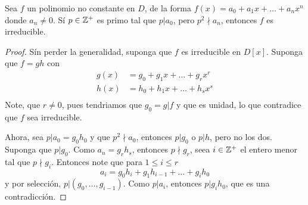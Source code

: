 \begin{theorem}\label{18.77}
    Sea $f$ un polinomio no constante en $D$, de la forma
    $f(x)=a_0+a_1x+\dots+a_nx^n$ donde $a_n \neq 0$. S\'i  $p \in \mathbb{Z}^+$ es primo
    tal que  $p|a_0$, pero $p^2 \nmid a_n$, entonces  $f$ es irreducible.
\end{theorem}
\begin{proof}
    S\'in perder la generalidad, suponga que $f$ es irreducible en $D[x]$.
    Suponga que $f=gh$ con
    \begin{align*}
        g(x)    &=  g_0+g_1x+\dots+g_rx^r       \\
        h(x)    &=  h_0+h_1x+\dots+h_sx^s       \\
    \end{align*}
    Note, que $r \neq 0$, pues tendriamos que $g_0=g|f$ y que es unidad, lo que
    contradice que $f$ sea irreducible.

    Ahora, sea  $p|a_0=g_0h_0$ y que $p^2 \nmid a_0$, entonces $p | g_0$ o $p |
    h$, pero no los dos. Suponga que  $p|g_0$. Como $a_n=g_rh_s$, entonces  $p
    \nmid g_r$, seea  $i \in \mathbb{Z}^+$ el entero menor tal que  $p \nmid g_i$.
    Entonces note que para  $1 \leq i \leq r$
    \begin{equation*}
        a_i=g_0h_i+g_1h_{i-1}+\dots+g_ih_0
    \end{equation*}
    y por selecci\'on, $p|(g_0, \dots, g_{i-1})$. Como $p|a_i$, entonces
    $p|g_ih_0$, que es una contradicci\'on.
\end{proof}
